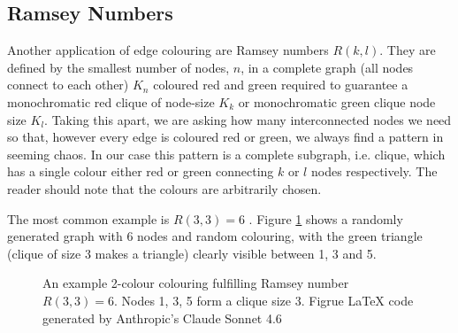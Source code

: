 \documentclass[12pt, a4paper]{article}   %
\begin{document}
\subsection{Ramsey Numbers}

Another application of edge colouring are Ramsey numbers \( R(k,l) \). They are defined by the smallest number of nodes, \(n\), in a complete graph (all nodes connect to each other) \( K_n \) coloured red and green required to guarantee a monochromatic red clique of node-size \( K_k \) or monochromatic green clique node size \( K_l \). Taking this apart, we are asking how many interconnected nodes we need so that, however every edge is coloured red or green, we always find a pattern in seeming chaos. In our case this pattern is a complete subgraph, i.e. clique, which has a single colour either red or green connecting \( k \) or \( l \) nodes respectively. The reader should note that the colours are arbitrarily chosen. \autocite{chahamisRamseyNumbers2018}

The most common example is \( R(3,3) = 6 \) \autocite{chahamisRamseyNumbers2018}. Figure \ref{fig:ramsey33} shows a randomly generated graph with 6 nodes and random colouring, with the green triangle (clique of size 3 makes a triangle) clearly visible between 1, 3 and 5.

\begin{figure}[H]
\centering
{}
\caption{An example 2-colour colouring fulfilling Ramsey number \( R(3,3)=6 \). Nodes 1, 3, 5 form a clique size 3. Figrue LaTeX code generated by Anthropic's Claude Sonnet 4.6}
\label{fig:ramsey33}
\end{figure}
\end{document}
